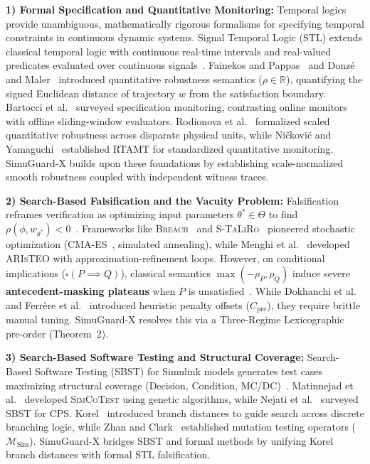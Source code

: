 \documentclass[journal]{IEEEtran}
\begin{document}
\noindent\textbf{1) Formal Specification and Quantitative Monitoring:}
Temporal logics provide unambiguous, mathematically rigorous formalisms for specifying temporal constraints in continuous dynamic systems. Signal Temporal Logic (STL) extends classical temporal logic with continuous real-time intervals and real-valued predicates evaluated over continuous signals~\cite{maler2004monitoring,fainekos2009robustness}. Fainekos and Pappas~\cite{fainekos2009robustness} and Donz{\'e} and Maler~\cite{donze2010breach} introduced quantitative robustness semantics ($\rho \in \mathbb{R}$), quantifying the signed Euclidean distance of trajectory $w$ from the satisfaction boundary. Bartocci et al.~\cite{bartocci2018specification} surveyed specification monitoring, contrasting online monitors~\cite{deshmukh2017testing} with offline sliding-window evaluators. Rodionova et al.~\cite{rodionova2021scaled} formalized scaled quantitative robustness across disparate physical units, while Ni{\v{c}}kovi{\'c} and Yamaguchi~\cite{nickovic2020rtamt} established RTAMT for standardized quantitative monitoring. SimuGuard-X builds upon these foundations by establishing scale-normalized smooth robustness coupled with independent witness traces.

\noindent\textbf{2) Search-Based Falsification and the Vacuity Problem:}
Falsification reframes verification as optimizing input parameters $\theta^* \in \Theta$ to find $\rho(\phi, w_{\theta^*}) < 0$~\cite{donze2010breach,annpureddy2011staliro,ernst2021falstar,zhang2021foresee,menghi2020generating,menghi2021aristeo}. Frameworks like \textsc{Breach}~\cite{donze2010breach} and \textsc{S-TaLiRo}~\cite{annpureddy2011staliro} pioneered stochastic optimization (CMA-ES~\cite{hansen2001completely}, simulated annealing), while Menghi et al.~\cite{menghi2020generating,menghi2021aristeo} developed \textsc{ARIsTEO} with approximation-refinement loops. However, on conditional implications ($\square(P \implies Q)$), classical semantics $\max(-\rho_P, \rho_Q)$ induce severe \textbf{antecedent-masking plateaus} when $P$ is unsatisfied~\cite{dokhanchi2018vacuity,ferrere2019vacuity}. While Dokhanchi et al.~\cite{dokhanchi2018vacuity} and Ferr{\`e}re et al.~\cite{ferrere2019vacuity} introduced heuristic penalty offsets ($C_{\text{pre}}$), they require brittle manual tuning. SimuGuard-X resolves this via a Three-Regime Lexicographic pre-order (Theorem~2).

\noindent\textbf{3) Search-Based Software Testing and Structural Coverage:}
Search-Based Software Testing (SBST) for Simulink models generates test cases maximizing structural coverage (Decision, Condition, MC/DC)~\cite{matinnejad2015automated,nejati2019search,arcuri2011practical}. Matinnejad et al.~\cite{matinnejad2015automated} developed \textsc{SimCoTest} using genetic algorithms, while Nejati et al.~\cite{nejati2019search} surveyed SBST for CPS. Korel~\cite{korel1990automated} introduced branch distances to guide search across discrete branching logic, while Zhan and Clark~\cite{zhan2005mutation} established mutation testing operators ($\mathcal{M}_{\text{Sim}}$). SimuGuard-X bridges SBST and formal methods by unifying Korel branch distances with formal STL falsification.
\end{document}
